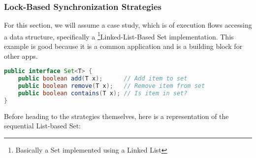    \subsubsection{Lock-Based Synchronization Strategies}
   \par For this section, we will assume a case study, which is of execution flows accessing a data structure, specifically a \footnote{Basically a Set implemented using a Linked List}{Linked-List-Based Set implementation}. This example is good because it is a common application and is a building block for other apps.
\begin{tcolorbox}[colback=nightblue!5!white, colframe=nightblue!75!black, title= Set Interface]
    \begin{lstlisting}[label={lst:setinterface}, language=Java, morekeywords={T}]
public interface Set<T> {
    public boolean add(T x);      // Add item to set
    public boolean remove(T x);   // Remove item from set
    public boolean contains(T x); // Is item in set?
}\end{lstlisting}
\end{tcolorbox}
%
\clearpage
%
\par Before heading to the strategies themselves, here is a representation of the sequential List-based Set:
